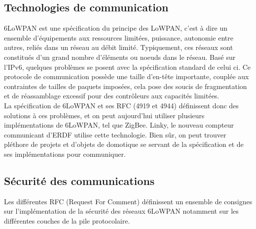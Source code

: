 	\subsection{Technologies de communication}
		6LoWPAN est une spécification du principe des LoWPAN, c'est à dire un ensemble d'équipements aux ressources limitées, puissance, autonomie entre autres, reliés dans un réseau au débit limité. Typiquement, ces réseaux sont constitués d'un grand nombre d'éléments ou noeuds dans le réseau.
		Basé sur l'IPv6, quelques problèmes se posent avec la spécification standard de celui ci. Ce protocole de communication possède une taille d'en-tête importante, couplée aux contraintes de tailles de paquets imposées, cela pose des soucis de fragmentation et de réassamblage excessif pour des contrôleurs aux capacités limitées.\\
		La spécification de 6LoWPAN et ses RFC (4919 et 4944) définissent donc des solutions à ces problèmes, et on peut aujourd'hui utiliser plusieurs implémentations de 6LoWPAN, tel que ZigBee. Linky, le nouveau compteur communicant d'ERDF utilise cette technologie. Bien sûr, on peut trouver pléthore de projets et d'objets de domotique se servant de la spécification et de ses implémentations pour communiquer.
		
		
	\subsection{Sécurité des communications}
		Les différentes RFC (Request For Comment) définissent un ensemble de consignes sur l'implémentation de la sécurité des réseaux 6LoWPAN notamment sur les différentes couches de la pile protocolaire.
		
